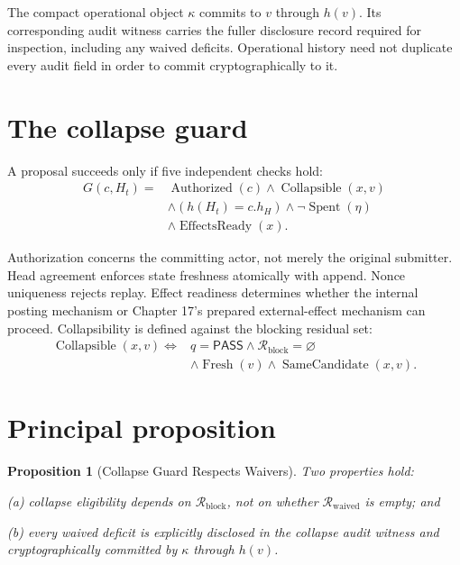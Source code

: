 \documentclass[11pt,openany]{book}
\newtheorem{proposition}[definition]{Proposition}
\newcommand{\Pass}{\mathsf{PASS}}
\begin{document}
The compact operational object \(\kappa\) commits to \(v\) through \(h(v)\).
Its corresponding audit witness carries the fuller disclosure record required
for inspection, including any waived deficits. Operational history need not
duplicate every audit field in order to commit cryptographically to it.

\section{The collapse guard}

A proposal succeeds only if five independent checks hold:
\[
\begin{aligned}
G(c,H_t)={}&\operatorname{Authorized}(c)
 \land\operatorname{Collapsible}(x,v)\\
&\land(h(H_t)=c.h_H)
 \land\neg\operatorname{Spent}(\eta)\\
&\land\operatorname{EffectsReady}(x).
\end{aligned}
\]

Authorization concerns the committing actor, not merely the original
submitter. Head agreement enforces state freshness atomically with append.
Nonce uniqueness rejects replay. Effect readiness determines whether the
internal posting mechanism or Chapter 17's prepared external-effect mechanism
can proceed. Collapsibility is defined against the blocking residual set:
\[
\begin{aligned}
\operatorname{Collapsible}(x,v)\iff{}&q=\Pass
 \land\mathcal R_{\mathrm{block}}=\varnothing\\
&\land\operatorname{Fresh}(v)
 \land\operatorname{SameCandidate}(x,v).
\end{aligned}
\]

\section{Principal proposition}

\begin{proposition}[Collapse Guard Respects Waivers]
Two properties hold:

\textnormal{(a)} collapse eligibility depends on
\(\mathcal R_{\mathrm{block}}\), not on whether
\(\mathcal R_{\mathrm{waived}}\) is empty; and

\textnormal{(b)} every waived deficit is explicitly disclosed in the collapse
audit witness and cryptographically committed by \(\kappa\) through \(h(v)\).
\end{proposition}
\end{document}
